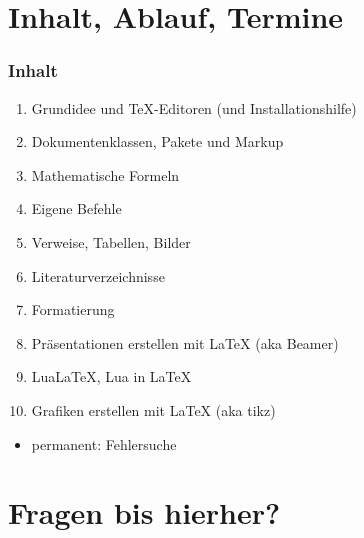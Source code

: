 
\subtitle{Einführung}
\date{Sommersemester 2017}



\section{Inhalt, Ablauf, Termine}
\begin{frame}[fragile]
  \frametitle{Inhalt}
  \begin{enumerate}%
  \item Grundidee und TeX-Editoren (und Installationshilfe)
  \item Dokumentenklassen, Pakete und Markup
  \item Mathematische Formeln
  \item Eigene Befehle
  \item Verweise, Tabellen, Bilder%
  \item Literaturverzeichnisse%
  \item Formatierung
  \item Präsentationen erstellen mit \LaTeX{} (aka Beamer)
  \item Lua\LaTeX, Lua in \LaTeX
  \item Grafiken erstellen mit \LaTeX{} (aka tikz)
  \end{enumerate}
  \begin{itemize}
    \item permanent: Fehlersuche
  \end{itemize}
\end{frame}

\section{Fragen bis hierher?}

